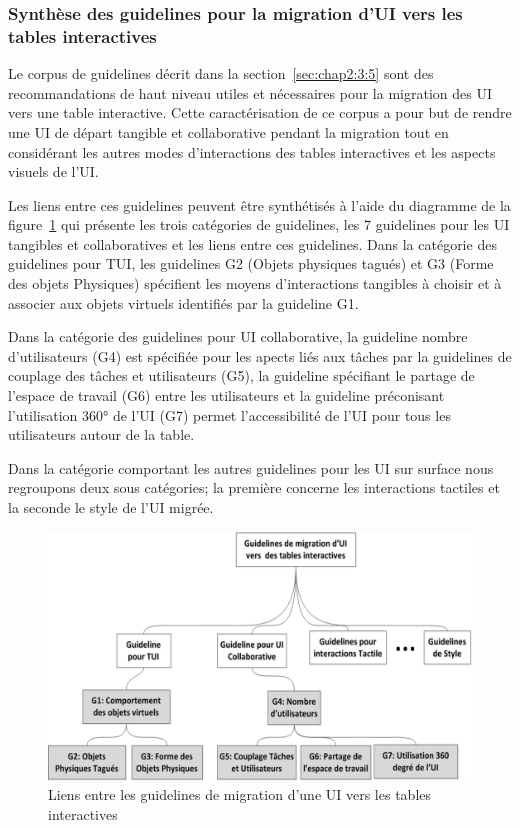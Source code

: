 \subsubsection{Synthèse des guidelines pour la migration d'UI vers les tables interactives}
\label{sec:chap2:3:5:5}
Le corpus de guidelines décrit dans la section~\ref{sec:chap2:3:5} sont des recommandations de haut niveau utiles et nécessaires pour la migration des UI vers une table interactive. Cette caractérisation de ce corpus a pour but de rendre une UI de départ tangible et collaborative pendant la migration tout en considérant les autres modes d'interactions des tables interactives et les aspects visuels de l'UI.

Les liens entre ces guidelines peuvent être synthétisés à l'aide du diagramme de la figure~\ref{fig:chap2:21} qui présente les trois catégories de guidelines, les 7 guidelines pour les UI tangibles et collaboratives et les liens entre ces guidelines. Dans la catégorie des guidelines pour TUI, les guidelines G2 (Objets physiques tagués) et G3 (Forme des objets Physiques) spécifient les moyens d'interactions tangibles à choisir et à associer aux objets virtuels identifiés par la guideline G1. 

Dans la catégorie des guidelines pour UI collaborative, la guideline nombre d'utilisateurs (G4) est spécifiée pour les apects liés aux tâches par la guidelines de couplage des tâches et utilisateurs (G5), la guideline spécifiant le partage de l'espace de travail (G6) entre les utilisateurs et la guideline préconisant l'utilisation 360° de l'UI (G7) permet l'accessibilité de l'UI pour tous les utilisateurs autour de la table.

Dans la catégorie comportant les autres guidelines pour les UI sur surface nous regroupons deux sous catégories; la première concerne les interactions tactiles et la seconde le style de l'UI migrée.
\begin{figure}[h]
\begin{center}
\includegraphics[angle=270, width=450pt]{chap2/img-23-1}
\caption{Liens entre les guidelines de migration d'une UI vers les tables interactives}
\label{fig:chap2:21}
\end{center}
\end{figure}


